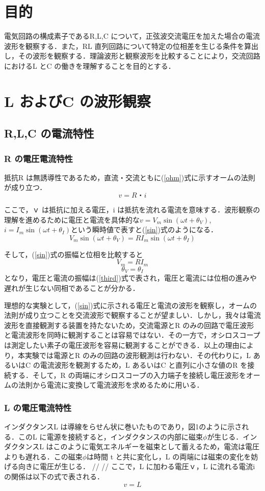 \documentclass{ujarticle}
\begin{document}
\section{目的}
電気回路の構成素子であるR,L,C について，正弦波交流電圧を加えた場合の電流波形を観察する．また，RL 直列回路について特定の位相差を生じる条件を算出し，その波形を観察する．理論波形と観察波形を比較することにより，交流回路におけるL とC の働きを理解することを目的とする．

\section{L およびC の波形観察}
\subsection{R,L,C の電流特性}
\subsubsection{R の電圧電流特性}
抵抗R は無誘導性であるため，直流・交流ともに(\ref{ohm})式に示すオームの法則が成り立つ．
\begin{equation}
\label{ohm}
v = R・i
\end{equation}

ここで，ｖ は抵抗に加える電圧，i は抵抗を流れる電流を意味する．波形観察の理解を進めるために電圧と電流を具体的な$v = V_{m}\sin (\omega t + \theta _{V} )$,$i = I_{m}\sin (\omega t + \theta _{I} )$という瞬時値で表すと(\ref{sin})式のようになる．
\begin{equation}
\label{sin}
V_{m}\sin (\omega t + \theta _{V} ) = RI_{m}\sin(\omega t + \theta _{I} )
\end{equation}

そして，(\ref{sin})式の振幅と位相を比較すると
\begin{equation}
\label{third}
V_{m} = RI_{m}
\end{equation}
\begin{equation}
\label{four}
\theta _{V} = \theta _{I}
\end{equation}
となり，電圧と電流の振幅は(\ref{third})式で表され，電圧と電流には位相の進みや遅れが生じない同相であることが分かる．

理想的な実験として，(\ref{sin})式に示される電圧と電流の波形を観察し，オームの法則が成り立つことを交流波形で観察することが望ましい．しかし，我々は電流波形を直接観測する装置を持たないため，交流電源とR のみの回路で電圧波形と電流波形を同時に観測することは容易ではない．その一方で，オシロスコープは測定したい素子の電圧波形を容易に観測することができる．以上の理由により，本実験では電源とR のみの回路の波形観測は行わない．その代わりに，L あるいはC の電流波形を観測するため，L あるいはC と直列に小さな値のR を接続する．そして，R の両端にオシロスコープの入力端子を接続し電圧波形をオームの法則から電流に変換して電流波形を求めるために用いる．

\subsubsection{L の電圧電流特性}
インダクタンスL は導線をらせん状に巻いたものであり，図1のように示される．このL に電源を接続すると，インダクタンスの内部に磁束$\phi$が生じる．インダクタンスL はこのように電気エネルギーを磁束として蓄えるため，電流は電圧よりも遅れる．この磁束$\phi$は時間 t と共に変化し，L の両端には磁束の変化を妨げる向きに電圧が生じる．
//
//
ここで，L に加わる電圧ｖ，L に流れる電流i の関係は以下の式で表される．
\begin{equation}
\label{fifth}
v = L
\end{equation}
\end{document}
